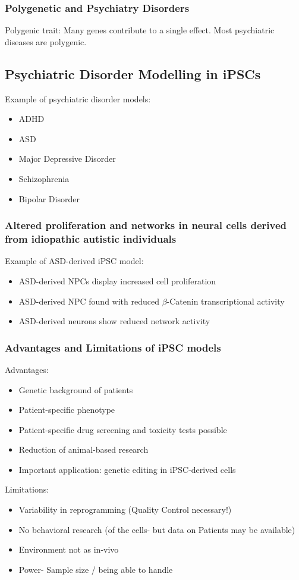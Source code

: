 \begin{itemize}
\begin{itemize}
\subsubsection{Polygenetic and Psychiatry Disorders}
Polygenic trait: Many genes contribute to a single effect. Most psychiatric diseases are polygenic.
\subsection{Psychiatric Disorder Modelling in iPSCs}
Example of psychiatric disorder models:
\begin{itemize}
    \item ADHD
    \item ASD
    \item Major Depressive Disorder
    \item Schizophrenia
    \item Bipolar Disorder
\end{itemize}
\subsubsection{Altered proliferation and networks in neural cells derived from  idiopathic autistic individuals}
Example of ASD-derived iPSC model:
\begin{itemize}
    \item ASD-derived NPCs display increased cell proliferation
    \item ASD-derived NPC found with reduced $\beta$-Catenin transcriptional activity
    \item ASD-derived neurons show reduced network activity
\end{itemize}
\subsubsection{Advantages and Limitations of iPSC models}
Advantages:
\begin{itemize}
    \item Genetic background of patients
\item Patient-specific phenotype 
\item Patient-specific drug screening
and toxicity tests possible
\item Reduction of animal-based
research
\item Important application: genetic
editing in iPSC-derived cells
\end{itemize}

Limitations:
\begin{itemize}
    \item Variability in reprogramming
(Quality Control necessary!)
\item No behavioral research (of the
cells- but data on Patients may be
available)
\item Environment not as in-vivo
\item Power- Sample size / being able to
handle
\end{itemize}


\end{itemize}
\end{itemize}
